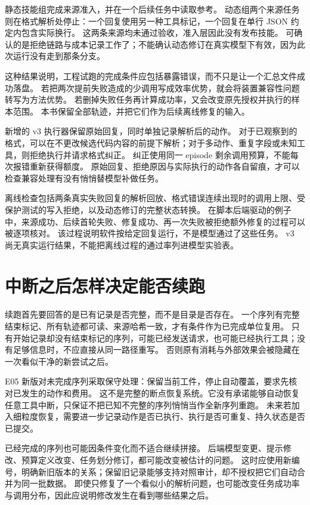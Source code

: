静态技能组完成来源准入，并在一个后续任务中读取参考。
动态组两个来源任务则在格式解析处停止：一个回复使用另一种工具标记，一个回复在单行 JSON 约定内包含实际换行。
这两条来源均未通过验收，准入层因此没有发布技能。
可确认的是拒绝链路与成本记录工作了；不能确认动态修订在真实模型下有效，因为此次运行没有走到那条分支。

这种结果说明，工程试跑的完成条件应包括暴露错误，而不只是让一个汇总文件成功落盘。
若把两次提前失败造成的少调用写成效率优势，就会将装置兼容性问题转写为方法优势。
若删掉失败任务再计算成功率，又会改变原先授权并执行的样本范围。
本书保留全部轨迹，并把它们作为后续离线修复的输入。

新增的 v3 执行器保留原始回复，同时单独记录解析后的动作。
对于已观察到的格式，可以在不更改候选代码内容的前提下解析；对于多动作、重复字段或未知工具，则拒绝执行并请求格式纠正。
纠正使用同一 episode 剩余调用预算，不能每次报错重新获得额度。
原始回复、拒绝原因与实际执行的动作各自留痕，才可以检查兼容处理有没有悄悄替模型补做任务。

离线检查包括两条真实失败回复的解析回放、格式错误连续出现时的调用上限、受保护测试的写入拒绝，以及动态修订的完整状态转换。
在脚本后端驱动的例子中，来源成功、后续首轮失败、修复成功、再一次失败被拒绝额外修复的过程可以被逐项核对。
该过程说明软件按给定回复运行，不是模型通过了这些任务。
v3 尚无真实运行结果，不能把离线过程的通过率列进模型实验表。

\section{中断之后怎样决定能否续跑}
\label{sec:appb-resume}

续跑首先要回答的是已有记录是否完整，而不是目录是否存在。
一个序列有完整结束标记、所有轨迹都可读、来源哈希一致，才有条件作为已完成单位复用。
只有开始记录却没有结束标记的序列，可能已经发送请求，也可能已经执行工具；没有足够信息时，不应直接从同一路径重写。
否则原有消耗与外部效果会被隐藏在一次看似干净的新尝试之后。

E05 新版对未完成序列采取保守处理：保留当前工件，停止自动覆盖，要求先核对已发生的动作和费用。
这不是完整的断点恢复系统。它没有承诺能够自动恢复任意工具中断，只保证不把已知不完整的序列悄悄当作全新序列重跑。
未来若加入细粒度恢复，需要进一步记录动作是否已执行、执行是否可重复、持久状态是否已提交。

已经完成的序列也可能因条件变化而不适合继续拼接。
后端模型变更、提示修改、预算定义改变、任务划分修订，都可能改变被估计的问题。
这时应使用新编号，明确新旧版本的关系；保留旧记录能够支持对照审计，却不授权把它们自动合并为同一批数据。
即使只修复了一个看似小的解析问题，也可能改变任务成功率与调用分布，因此应说明修改发生在看到哪些结果之后。


